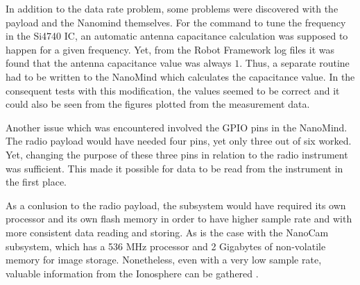 \documentclass[english,12pt,a4paper,pdftex,elec,utf8]{aaltothesis}
\begin{document}
In addition to the data rate problem, some problems were discovered with the payload and the Nanomind themselves. For the command to tune the frequency in the Si4740 IC, an automatic antenna capacitance calculation was supposed to happen for a given frequency. Yet, from the Robot Framework log files it was found that the antenna capacitance value was always $1$. Thus, a separate routine had to be written to the NanoMind which calculates the capacitance value. In the consequent tests with this modification, the values seemed to be correct and it could also be seen from the figures plotted from the measurement data.\par 
Another issue which was encountered involved the GPIO pins in the NanoMind. The radio payload would have needed four pins, yet only three out of six worked. Yet, changing the purpose of these three pins in relation to the radio instrument was sufficient. This made it possible for data to be read from the instrument in the first place.\par 
As a conlusion to the radio payload, the subsystem would have required its own processor and its own flash memory in order to have higher sample rate and with more consistent data reading and storing. As is the case with the NanoCam subsystem, which has a 536 MHz processor and 2 Gigabytes of non-volatile memory for image storage. Nonetheless, even with a very low sample rate, valuable information from the Ionosphere can be gathered \cite{esanpapru}.    
\end{document}
